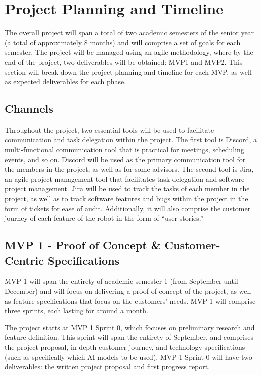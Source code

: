 \section{Project Planning and Timeline}

The overall project will span a total of two academic semesters of the senior year (a total of approximately 8 months) and will comprise a set of goals for each semester. The project will be managed using an agile methodology, where by the end of the project, two deliverables will be obtained: MVP1 and MVP2. This section will break down the project planning and timeline for each MVP, as well as expected deliverables for each phase.

\subsection{Channels}

Throughout the project, two essential tools will be used to facilitate communication and task delegation within the project. The first tool is Discord, a multi-functional communication tool that is practical for meetings, scheduling events, and so on. Discord will be used as the primary communication tool for the members in the project, as well as for some advisors. The second tool is Jira, an agile project management tool that facilitates task delegation and software project management. Jira will be used to track the tasks of each member in the project, as well as to track software features and bugs within the project in the form of tickets for ease of audit. Additionally, it will also comprise the customer journey of each feature of the robot in the form of “user stories.”

\subsection{MVP 1 - Proof of Concept \& Customer-Centric Specifications}

MVP 1 will span the entirety of academic semester 1 (from September until December) and will focus on delivering a proof of concept of the project, as well as feature specifications that focus on the customers’ needs. MVP 1 will comprise three sprints, each lasting for around a month.

The project starts at MVP 1 Sprint 0, which focuses on preliminary research and feature definition. This sprint will span the entirety of September, and comprises the project proposal, in-depth customer journey, and technology specifications (such as specifically which AI models to be used). MVP 1 Sprint 0 will have two deliverables: the written project proposal and first progress report.

